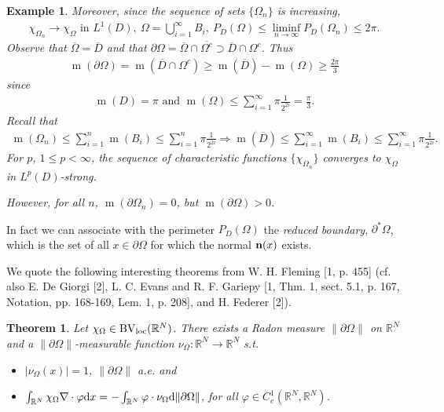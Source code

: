 \documentclass{book}
\numberwithin{equation}{section}
\newtheorem{theorem}{Theorem}[section]
\newtheorem{example}{Example}[section]
\begin{document}
\begin{enumerate}
\begin{example}
        Moreover, since the sequence of sets $\{\Omega_n\}$ is increasing,
        \begin{align*}
            \chi_{\Omega_n}\to\chi_\Omega \mbox{ in } L^1(D),\ \Omega = \bigcup_{i=1}^\infty B_i,\ P_D(\Omega)\le\liminf_{n\to\infty} P_D(\Omega_n)\le 2\pi.
        \end{align*}
        Observe that $\overline{\Omega} = \overline{D}$ and that $\partial\Omega = \overline{\Omega}\cap\overline{\Omega^c}\supset\overline{D}\cap\Omega^c$. Thus
        \begin{align*}
            \operatorname{m}(\partial\Omega) = \operatorname{m}(\overline{D}\cap\Omega^c)\ge\operatorname{m}(\overline{D}) - \operatorname{m}(\Omega)\ge\frac{2\pi}{3}
        \end{align*}
        since
        \begin{align*}
            \operatorname{m}(D) = \pi \mbox{ and } \operatorname{m}(\Omega)\le\sum_{i=1}^\infty \pi\frac{1}{2^{2i}} = \frac{\pi}{3}.
        \end{align*}
        Recall that
        \begin{align*}
            \operatorname{m}(\Omega_n)\le\sum_{i=1}^n \operatorname{m}(B_i)\le\sum_{i=1}^n \pi\frac{1}{2^{2i}}\Rightarrow\operatorname{m}(\overline{D})\le\sum_{i=1}^\infty \operatorname{m}(B_i)\le\sum_{i=1}^\infty \pi\frac{1}{2^{2i}}. 
        \end{align*}
        For $p$, $1\le p < \infty$, the sequence of characteristic functions $\{\chi_{\Omega_n}\}$ converges to $\chi_\Omega$ in $L^p(D)$-strong.
        
        However, for all $n$, $\operatorname{m}(\partial\Omega_n) = 0$, but $\operatorname{m}(\partial\Omega) > 0$.
    \end{example}
    In fact we can associate with the perimeter $P_D(\Omega)$ the \textit{reduced boundary}, $\partial^*\Omega$, which is the set of all $x\in\partial\Omega$ for which the normal ${\bf n}(x)$ exists.
    
    We quote the following interesting theorems from W. H. Fleming [1, p. 455] (cf. also E. De Giorgi [2], L. C. Evans and R. F. Gariepy [1, Thm. 1, sect. 5.1, p. 167, Notation, pp. 168-169, Lem. 1, p. 208], and H. Federer [2]).
    
    \begin{theorem}
        Let $\chi_\Omega\in\operatorname{BV}_{\rm loc}(\mathbb{R}^N)$. There exists a Radon measure $\|\partial\Omega\|$ on $\mathbb{R}^N$ and a $\|\partial\Omega\|$-measurable function $\nu_\Omega:\mathbb{R}^N\to\mathbb{R}^N$ s.t.
        \begin{itemize}
            \item[(i)] $|\nu_\Omega(x)| = 1$, $\|\partial\Omega\|$ a.e. and
            \item[(ii)] $\int_{\mathbb{R}^N} \chi_\Omega\nabla\cdot\varphi{\rm d}x = -\int_{\mathbb{R}^N} \varphi\cdot\nu_\Omega{\rm d}\|\partial\Omega\|$, for all $\varphi\in C_c^1(\mathbb{R}^N,\mathbb{R}^N)$.
        \end{itemize}
    \end{theorem}
    

\end{enumerate}
\end{document}

